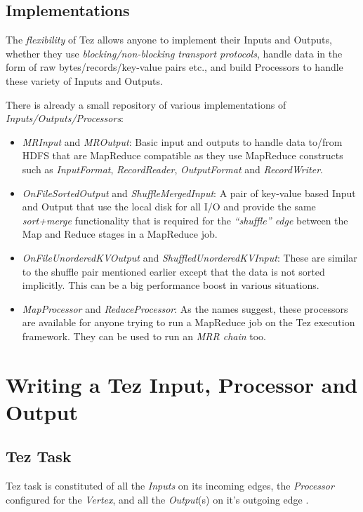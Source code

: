 \documentclass[twocolumn]{article}
\begin{document}
\subsection{Implementations}

The \emph{flexibility} of Tez allows anyone to implement their Inputs
and Outputs, whether they use \emph{blocking/non-blocking transport
protocols}, handle data in the form of raw bytes/records/key-value pairs
etc., and build Processors to handle these variety of Inputs and
Outputs.

There is already a small repository of various implementations of
\textit{Inputs/Outputs/Processors}:

\begin{itemize}
\item
  \emph{MRInput} and \emph{MROutput}: Basic input and outputs to
  handle data to/from HDFS that are MapReduce compatible as they use
  MapReduce constructs such as \textit{InputFormat}, \textit{RecordReader}, \textit{OutputFormat}
  and \textit{RecordWriter}.
\item
  \emph{OnFileSortedOutput} and \emph{ShuffleMergedInput}: A pair of  key-value based Input and Output that use the local disk for all I/O
  and provide the same \textit{sort+merge} functionality that is required for the
  \textit{``shuffle'' edge} between the Map and Reduce stages in a MapReduce job.
\item
  \emph{OnFileUnorderedKVOutput} and
  \emph{ShuffledUnorderedKVInput}: These are similar to the shuffle
  pair mentioned earlier except that the data is not sorted implicitly.
  This can be a big performance boost in various situations.
\item
  \emph{MapProcessor} and \emph{ReduceProcessor}: As the names
  suggest, these processors are available for anyone trying to run a
  MapReduce job on the Tez execution framework. They can be used to run
  an \textit{MRR chain} too.
\end{itemize}


\section{Writing a Tez Input, Processor and Output}

\subsection{Tez Task}
Tez task is constituted of all the \textit{Inputs} on its incoming edges, the
\textit{Processor} configured for the \textit{Vertex}, and all the \textit{Output}(s) on it's
outgoing edge \cite{Saha:2013-04}.
\end{document}
